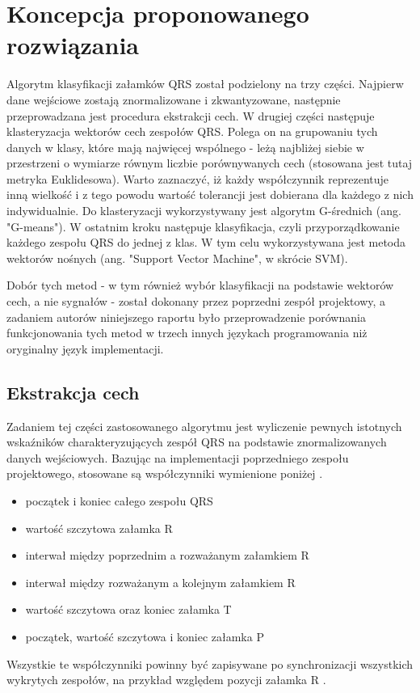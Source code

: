 \section{Koncepcja proponowanego rozwiązania}

\qquad Algorytm klasyfikacji załamków QRS został podzielony na trzy części. Najpierw dane wejściowe zostają znormalizowane i zkwantyzowane, następnie przeprowadzana jest procedura ekstrakcji cech. W drugiej części następuje klasteryzacja wektorów cech zespołów QRS. Polega on na grupowaniu tych danych w klasy, które mają najwięcej wspólnego - leżą najbliżej siebie w przestrzeni o wymiarze równym liczbie porównywanych cech (stosowana jest tutaj metryka Euklidesowa). Warto zaznaczyć, iż każdy współczynnik reprezentuje inną wielkość i z tego powodu wartość tolerancji jest dobierana dla każdego z nich indywidualnie. Do klasteryzacji wykorzystywany jest algorytm G-średnich (ang. "G-means"). W ostatnim kroku następuje klasyfikacja, czyli przyporządkowanie każdego zespołu QRS do jednej z klas. W tym celu wykorzystywana jest metoda wektorów nośnych (ang. "Support Vector Machine", w skrócie SVM).

Dobór tych metod - w tym również wybór klasyfikacji na podstawie wektorów cech, a nie sygnałów - został dokonany przez poprzedni zespół projektowy, a zadaniem autorów niniejszego raportu było przeprowadzenie porównania funkcjonowania tych metod w trzech innych językach programowania niż oryginalny język implementacji.

\subsection{Ekstrakcja cech}
\qquad Zadaniem tej części zastosowanego algorytmu jest wyliczenie pewnych istotnych wskaźników charakteryzujących zespół QRS na podstawie znormalizowanych danych wejściowych. Bazując na implementacji poprzedniego zespołu projektowego, stosowane są współczynniki wymienione poniżej \cite{RaportKoncowy}.
\begin{itemize}
	\item początek i koniec całego zespołu QRS
	\item wartość szczytowa załamka R
	\item interwał między poprzednim a rozważanym załamkiem R
	\item interwał między rozważanym a kolejnym załamkiem R
	\item wartość szczytowa oraz koniec załamka T
	\item początek, wartość szczytowa i koniec załamka P
\end{itemize}
Wszystkie te współczynniki powinny być zapisywane po synchronizacji wszystkich wykrytych zespołów, na przykład względem pozycji załamka R \cite{Augustyniak}.

